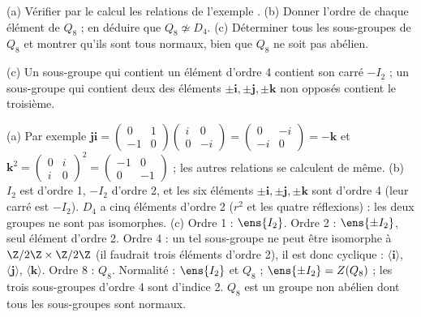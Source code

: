 \begin{exo}\label{exo-q8}
(a) Vérifier par le calcul les relations de l'exemple . (b) Donner l'ordre de chaque élément de $Q_8$ ; en déduire que $Q_8\not\simeq D_4$. (c) Déterminer tous les sous-groupes de $Q_8$ et montrer qu'ils sont tous normaux, bien que $Q_8$ ne soit pas abélien.
\begin{indication}
(c) Un sous-groupe qui contient un élément d'ordre 4 contient son carré $-I_2$ ; un sous-groupe qui contient deux des éléments $\pm\mathbf i,\pm\mathbf j,\pm\mathbf k$ non opposés contient le troisième.
\end{indication}
\begin{corrige}
(a) Par exemple $\mathbf j\mathbf i=\begin{pmatrix}0&1\\-1&0\end{pmatrix}\begin{pmatrix}i&0\\0&-i\end{pmatrix}=\begin{pmatrix}0&-i\\-i&0\end{pmatrix}=-\mathbf k$ et $\mathbf k^2=\begin{pmatrix}0&i\\i&0\end{pmatrix}^2=\begin{pmatrix}-1&0\\0&-1\end{pmatrix}$ ; les autres relations se calculent de même.
(b) $I_2$ est d'ordre 1, $-I_2$ d'ordre 2, et les six éléments $\pm\mathbf i,\pm\mathbf j,\pm\mathbf k$ sont d'ordre 4 (leur carré est $-I_2$). $D_4$ a cinq éléments d'ordre 2 ($r^2$ et les quatre réflexions) : les deux groupes ne sont pas isomorphes.
(c) Ordre 1 : $\ens{I_2}$. Ordre 2 : $\ens{\pm I_2}$, seul élément d'ordre 2. Ordre 4 : un tel sous-groupe ne peut être isomorphe à $\Z/2\Z\times\Z/2\Z$ (il faudrait trois éléments d'ordre 2), il est donc cyclique : $\langle\mathbf i\rangle$, $\langle\mathbf j\rangle$, $\langle\mathbf k\rangle$. Ordre 8 : $Q_8$. Normalité : $\ens{I_2}$ et $Q_8$ ; $\ens{\pm I_2}=Z(Q_8)$ ; les trois sous-groupes d'ordre 4 sont d'indice 2. $Q_8$ est un groupe non abélien dont tous les sous-groupes sont normaux.
\end{corrige}
\end{exo}

